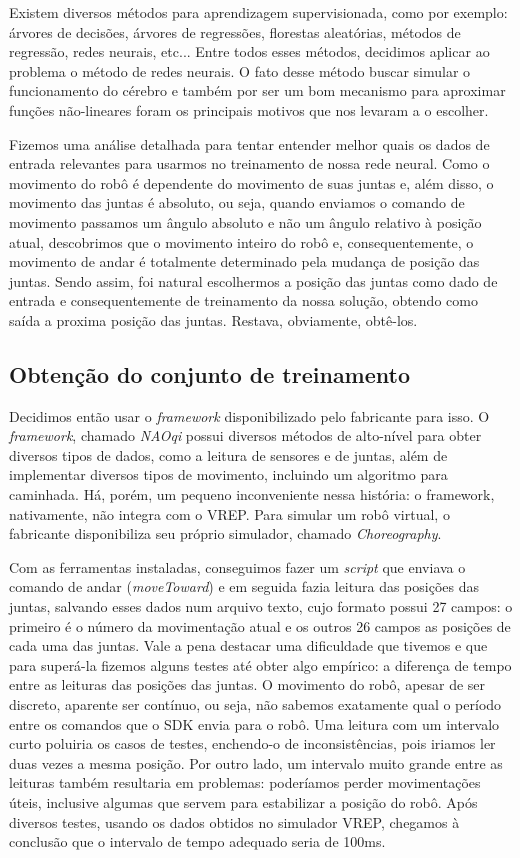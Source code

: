 \documentclass[twoside,conference,a4paper]{IEEEtran}
\begin{document}
Existem diversos métodos para aprendizagem supervisionada, como por exemplo: árvores de decisões, árvores de regressões, florestas aleatórias, métodos de regressão, redes neurais, etc... Entre todos esses métodos, decidimos aplicar ao problema o método de redes neurais. O fato desse método buscar simular o funcionamento do cérebro e também por ser um bom mecanismo para aproximar funções não-lineares foram os principais motivos que nos levaram a o escolher.

Fizemos uma análise detalhada para tentar entender melhor quais os dados de entrada relevantes para usarmos no treinamento de nossa rede neural. Como o movimento do robô é dependente do movimento de suas juntas e, além disso, o movimento das juntas é absoluto, ou seja, quando enviamos o comando de movimento passamos um ângulo absoluto e não um ângulo relativo à posição atual, descobrimos que o movimento inteiro do robô e, consequentemente, o movimento de andar é totalmente determinado pela mudança de posição das juntas. Sendo assim, foi natural escolhermos a posição das juntas como dado de entrada e consequentemente de treinamento da nossa solução, obtendo como saída a proxima posição das juntas. Restava, obviamente, obtê-los.

\subsection{Obtenção do conjunto de treinamento}

Decidimos então usar o \textsl{framework} disponibilizado pelo fabricante para isso. O \textsl{framework}, chamado \textsl{NAOqi}\cite{naoqi} possui diversos métodos de alto-nível para obter diversos tipos de dados, como a leitura de sensores e de juntas, além de implementar diversos tipos de movimento, incluindo um algoritmo para caminhada. Há, porém, um pequeno inconveniente nessa história: o framework, nativamente, não integra com o VREP. Para simular um robô virtual, o fabricante disponibiliza seu próprio simulador, chamado \textsl{Choreography}.

Com as ferramentas instaladas, conseguimos fazer um \textsl{script} que enviava o comando de andar (\textsl{moveToward}) e em seguida fazia leitura das posições das juntas, salvando esses dados num arquivo texto, cujo formato possui 27 campos: o primeiro é o número da movimentação atual e os outros 26 campos as posições de cada uma das juntas. Vale a pena destacar uma dificuldade que tivemos e que para superá-la fizemos alguns testes até obter algo empírico: a diferença de tempo entre as leituras das posições das juntas. O movimento do robô, apesar de ser discreto, aparente ser contínuo, ou seja, não sabemos exatamente qual o período entre os comandos que o SDK envia para o robô. Uma leitura com um intervalo curto poluiria os casos de testes, enchendo-o de inconsistências, pois iriamos ler duas vezes a mesma posição. Por outro lado, um intervalo muito grande entre as leituras também resultaria em problemas: poderíamos perder movimentações úteis, inclusive algumas que servem para estabilizar a posição do robô. Após diversos testes, usando os dados obtidos no simulador VREP, chegamos à conclusão que o intervalo de tempo adequado seria de 100ms.
\end{document}
